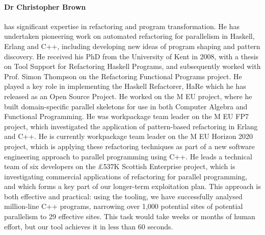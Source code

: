 \documentclass[a4paper,11pt]{article}
\begin{document}
\paragraph{Dr Christopher Brown}  
has significant expertise in refactoring and program
transformation. He has undertaken pioneering work on automated
refactoring for parallelism in Haskell, Erlang and C++,
including developing new ideas of program shaping and pattern discovery.
 He received his PhD from the University of Kent in 2008,
 with a thesis on Tool Support for Refactoring Haskell Programs,
 and subsequently worked with Prof. Simon Thompson %
 on the Refactoring Functional Programs project.
 He played a key role in implementing the Haskell Refactorer, HaRe %
 which he has released as an Open Source Project. %
 He worked on the M
 EU \science{} project, where he built domain-specific parallel
 skeletons for use in both Computer Algebra and Functional Programming.
 He was workpackage team leader on the M EU FP7 \paraphrase{}
 project, which investigated the application of pattern-based
 refactoring in Erlang and C++.
 He is currently workpackage team leader on the M EU Horizon 2020 \rephrase{} project,
 which is applying these refactoring techniques as part of a new software
 engineering approach to parallel programming using C++.
 He leads a technical team of six developers on the \pounds{537K} Scottish Enterprise
 \paraformance{} project, which is investigating commercial applications of refactoring
 for parallel programming, and which forms a key part of our longer-term exploitation plan.
 This approach is both effective and practical: using the \paraformance{} tooling, we have successfully analysed million-line C++ programs,
 narrowing over 1,000 potential sites of potential parallelism to 29 effective sites.
 This task would take weeks or months of human effort, but our tool achieves it in less than 60 seconds.
\end{document}

